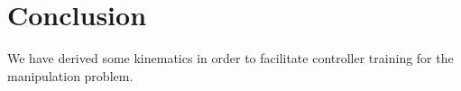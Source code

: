 \section{Conclusion}
\label{sec:conclusion}

We have derived some kinematics in order to facilitate controller training for 
the manipulation problem.